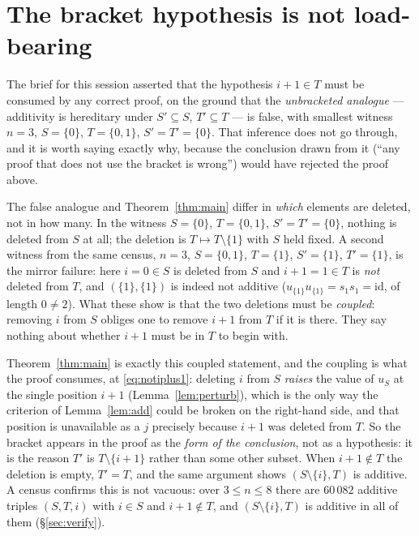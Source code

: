 \documentclass[11pt]{article}
\theoremstyle{definition}
\begin{document}
\section{The bracket hypothesis is not load-bearing}\label{sec:bracket}

The brief for this session asserted that the hypothesis $i+1\in T$ must be consumed by any
correct proof, on the ground that the \emph{unbracketed analogue} --- additivity is hereditary
under $S'\subseteq S$, $T'\subseteq T$ --- is false, with smallest witness $n=3$,
$S=\{0\}$, $T=\{0,1\}$, $S'=T'=\{0\}$. That inference does not go through, and it is worth
saying exactly why, because the conclusion drawn from it (``any proof that does not use the
bracket is wrong'') would have rejected the proof above.

The false analogue and Theorem~\ref{thm:main} differ in \emph{which} elements are deleted, not
in how many. In the witness $S=\{0\}$, $T=\{0,1\}$, $S'=T'=\{0\}$, nothing is deleted from $S$
at all; the deletion is $T\mapsto T\setminus\{1\}$ with $S$ held fixed. A second witness from
the same census, $n=3$, $S=\{0,1\}$, $T=\{1\}$, $S'=\{1\}$, $T'=\{1\}$, is the mirror failure:
here $i=0\in S$ is deleted from $S$ and $i+1=1\in T$ is \emph{not} deleted from $T$, and
$(\{1\},\{1\})$ is indeed not additive ($u_{\{1\}}u_{\{1\}}=s_1s_1=\mathrm{id}$, of length
$0\ne2$). What these show is that the two deletions must be \emph{coupled}: removing $i$ from
$S$ obliges one to remove $i+1$ from $T$ if it is there. They say nothing about whether $i+1$
must be in $T$ to begin with.

Theorem~\ref{thm:main} is exactly this coupled statement, and the coupling is what the proof
consumes, at \eqref{eq:notiplus1}: deleting $i$ from $S$ \emph{raises} the value of $u_S$ at
the single position $i+1$ (Lemma~\ref{lem:perturb}), which is the only way the criterion of
Lemma~\ref{lem:add} could be broken on the right-hand side, and that position is unavailable as
a $j$ precisely because $i+1$ was deleted from $T$. So the bracket appears in the proof as the
\emph{form of the conclusion}, not as a hypothesis: it is the reason $T'$ is $T\setminus\{i+1\}$
rather than some other subset. When $i+1\notin T$ the deletion is empty, $T'=T$, and the same
argument shows $(S\setminus\{i\},T)$ is additive. A census confirms this is not vacuous: over
$3\le n\le8$ there are $60\,082$ additive triples $(S,T,i)$ with $i\in S$ and $i+1\notin T$,
and $(S\setminus\{i\},T)$ is additive in all of them (\S\ref{sec:verify}).
\end{document}
